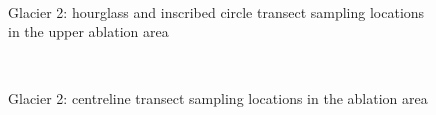 \documentclass{sfuthesis}
\begin{document}
{\begin{appendices}
\begin{figure}[H]
	\\
\caption[]{Glacier 2: hourglass and inscribed circle transect sampling locations in the upper ablation area}
\end{figure}
	\begin{figure}[H]
	\centering
	\\
\caption[]{Glacier 2: centreline transect sampling locations in the ablation area}
\end{figure}
	\begin{figure}[H]
	\centering

\end{figure}
\end{appendices}}
\end{document}
